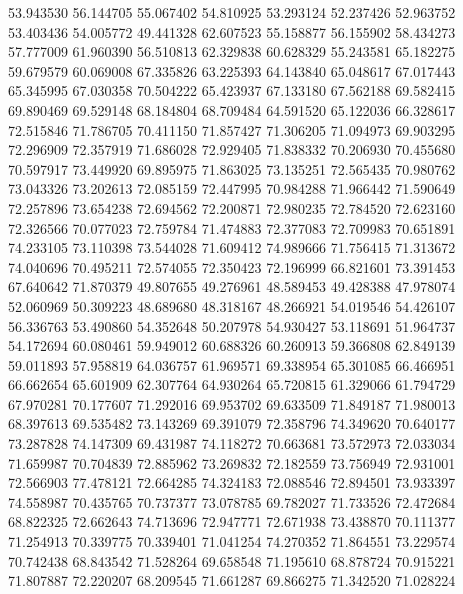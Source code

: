 53.943530
56.144705
55.067402
54.810925
53.293124
52.237426
52.963752
53.403436
54.005772
49.441328
62.607523
55.158877
56.155902
58.434273
57.777009
61.960390
56.510813
62.329838
60.628329
55.243581
65.182275
59.679579
60.069008
67.335826
63.225393
64.143840
65.048617
67.017443
65.345995
67.030358
70.504222
65.423937
67.133180
67.562188
69.582415
69.890469
69.529148
68.184804
68.709484
64.591520
65.122036
66.328617
72.515846
71.786705
70.411150
71.857427
71.306205
71.094973
69.903295
72.296909
72.357919
71.686028
72.929405
71.838332
70.206930
70.455680
70.597917
73.449920
69.895975
71.863025
73.135251
72.565435
70.980762
73.043326
73.202613
72.085159
72.447995
70.984288
71.966442
71.590649
72.257896
73.654238
72.694562
72.200871
72.980235
72.784520
72.623160
72.326566
70.077023
72.759784
71.474883
72.377083
72.709983
70.651891
74.233105
73.110398
73.544028
71.609412
74.989666
71.756415
71.313672
74.040696
70.495211
72.574055
72.350423
72.196999
66.821601
73.391453
67.640642
71.870379
49.807655
49.276961
48.589453
49.428388
47.978074
52.060969
50.309223
48.689680
48.318167
48.266921
54.019546
54.426107
56.336763
53.490860
54.352648
50.207978
54.930427
53.118691
51.964737
54.172694
60.080461
59.949012
60.688326
60.260913
59.366808
62.849139
59.011893
57.958819
64.036757
61.969571
69.338954
65.301085
66.466951
66.662654
65.601909
62.307764
64.930264
65.720815
61.329066
61.794729
67.970281
70.177607
71.292016
69.953702
69.633509
71.849187
71.980013
68.397613
69.535482
73.143269
69.391079
72.358796
74.349620
70.640177
73.287828
74.147309
69.431987
74.118272
70.663681
73.572973
72.033034
71.659987
70.704839
72.885962
73.269832
72.182559
73.756949
72.931001
72.566903
77.478121
72.664285
74.324183
72.088546
72.894501
73.933397
74.558987
70.435765
70.737377
73.078785
69.782027
71.733526
72.472684
68.822325
72.662643
74.713696
72.947771
72.671938
73.438870
70.111377
71.254913
70.339775
70.339401
71.041254
74.270352
71.864551
73.229574
70.742438
68.843542
71.528264
69.658548
71.195610
68.878724
70.915221
71.807887
72.220207
68.209545
71.661287
69.866275
71.342520
71.028224

